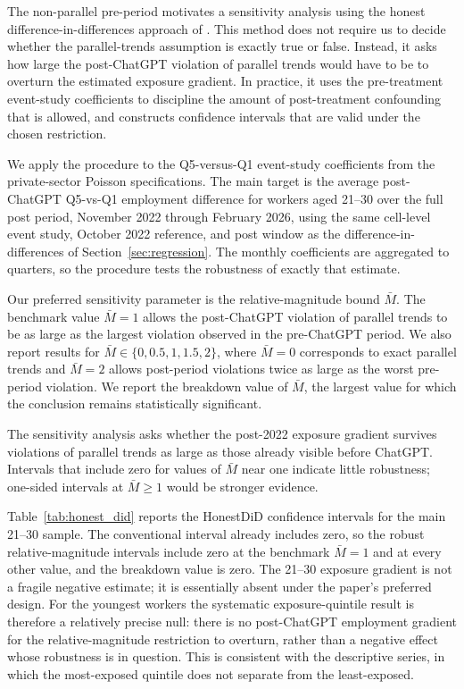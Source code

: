 \documentclass[12pt]{article}
\begin{document}
The non-parallel pre-period motivates a sensitivity analysis using the honest difference-in-differences approach of \citet{rambachan2023}. This method does not require us to decide whether the parallel-trends assumption is exactly true or false. Instead, it asks how large the post-ChatGPT violation of parallel trends would have to be to overturn the estimated exposure gradient. In practice, it uses the pre-treatment event-study coefficients to discipline the amount of post-treatment confounding that is allowed, and constructs confidence intervals that are valid under the chosen restriction.

We apply the procedure to the Q5-versus-Q1 event-study coefficients from the private-sector Poisson specifications. The main target is the average post-ChatGPT Q5-vs-Q1 employment difference for workers aged 21--30 over the full post period, November 2022 through February 2026, using the same cell-level event study, October 2022 reference, and post window as the difference-in-differences of Section~\ref{sec:regression}. The monthly coefficients are aggregated to quarters, so the procedure tests the robustness of exactly that estimate.  

Our preferred sensitivity parameter is the relative-magnitude bound $\bar{M}$. The benchmark value $\bar{M}=1$ allows the post-ChatGPT violation of parallel trends to be as large as the largest violation observed in the pre-ChatGPT period. We also report results for $\bar{M}\in\{0,0.5,1,1.5,2\}$, where $\bar{M}=0$ corresponds to exact parallel trends and $\bar{M}=2$ allows post-period violations twice as large as the worst pre-period violation. We report the breakdown value of $\bar{M}$, the largest value for which the conclusion remains statistically significant.

The sensitivity analysis asks whether the post-2022 exposure gradient survives violations of parallel trends as large as those already visible before ChatGPT. Intervals that include zero for values of $\bar{M}$ near one indicate little robustness; one-sided intervals at $\bar{M}\geq 1$ would be stronger evidence.

Table~\ref{tab:honest_did} reports the HonestDiD confidence intervals for the main 21--30 sample. The conventional interval already includes zero, so the robust relative-magnitude intervals include zero at the benchmark $\bar{M}=1$ and at every other value, and the breakdown value is zero. The 21--30 exposure gradient is not a fragile negative estimate; it is essentially absent under the paper's preferred design. For the youngest workers the systematic exposure-quintile result is therefore a relatively precise null: there is no post-ChatGPT employment gradient for the relative-magnitude restriction to overturn, rather than a negative effect whose robustness is in question. This is consistent with the descriptive series, in which the most-exposed quintile does not separate from the least-exposed.
\end{document}

